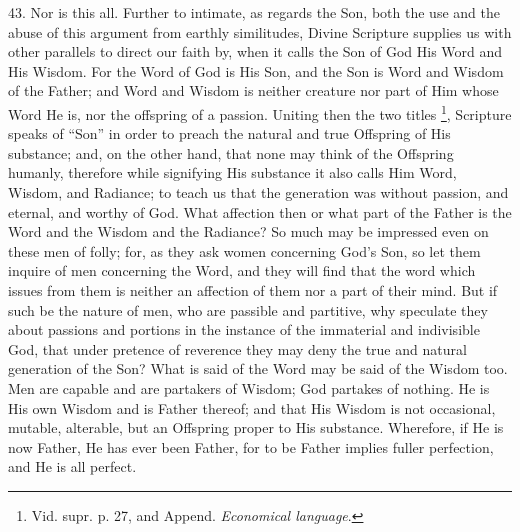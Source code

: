 43. Nor is this all. Further
to intimate, as regards the Son, both the use and the abuse of this
argument from earthly similitudes, Divine Scripture supplies us with
other parallels to direct our faith by, when it calls the Son of God
His Word and His Wisdom. For the Word of God is His Son, and the Son
is Word and Wisdom of the Father; and Word and Wisdom is neither
creature nor part of Him whose Word He is, nor the offspring of a
passion. Uniting then the two titles \footnote{Vid. supr. p. 27, and Append. \emph{Economical language}.}, Scripture speaks of ``Son'' in order to preach the natural and
true Offspring of His substance; and, on the other hand, that none may
think of the Offspring humanly, therefore while signifying His
substance it also calls Him Word, Wisdom, and Radiance; to teach us
that the generation was without passion, and eternal, and worthy of
God. What affection then or what part of the Father is the Word and
the Wisdom and the Radiance? So much may be impressed even on these
men of folly; for, as they ask women concerning God's Son, so let them
inquire of men concerning the Word, and they will find that the word
which issues from them is neither an affection of them nor a
part of their mind. But if such be the nature of men, who are passible
and partitive, why speculate they about passions and portions in the
instance of the immaterial and indivisible God, that under pretence of
reverence they may deny the true and natural generation of the Son?
What is said of the Word may be said of the Wisdom too. Men are
capable and are partakers of Wisdom; God partakes of nothing. He is
His own Wisdom and is Father thereof; and that His Wisdom is not
occasional, mutable, alterable, but an Offspring proper to His
substance. Wherefore, if He is now Father, He has ever been Father,
for to be Father implies fuller perfection, and He is all perfect.


